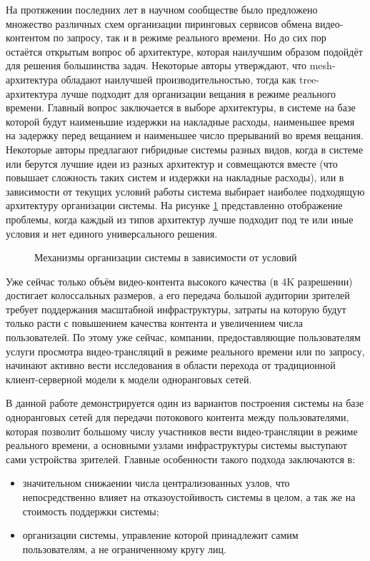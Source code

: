 	На протяжении последних лет в научном сообществе было предложено множество различных схем организации пиринговых
	сервисов обмена видео-контентом по запросу, так и в режиме реального времени. Но до сих пор остаётся открытым вопрос
	об архитектуре, которая наилучшим образом подойдёт для решения большинства задач. Некоторые авторы утверждают, что
	mesh-архитектура обладают наилучшей производительностью, тогда как tree-архитектура лучше подходит для организации
	вещания в режиме реального времени. Главный вопрос заключается в выборе архитектуры, в системе на базе которой будут
	наименьшие издержки на накладные расходы, наименьшее время на задержку перед вещанием и наименьшее число прерываний
	во время вещания. Некоторые авторы предлагают гибридные системы разных видов, когда в системе или берутся лучшие
	идеи из разных архитектур и совмещаются вместе (что повышает сложность таких систем и издержки на накладные расходы),
	или в зависимости от текущих условий работы система выбирает наиболее подходящую архитектуру организации системы.
	На рисунке \ref{img:p2p-mechanisms} представленно отображение проблемы, когда каждый из типов архитектур лучше
	подходит под те или иные условия и нет единого универсального решения.

	\begin{figure}[h]
		\caption{Механизмы организации системы в зависимости от условий}
		\label{img:p2p-mechanisms}
	\end{figure}

	Уже сейчас только объём видео-контента высокого качества (в 4K разрешении) достигает колоссальных размеров, а его
	передача большой аудитории зрителей требует поддержания масштабной инфраструктуры, затраты на которую будут только
	расти с повышением качества контента и увеличением числа пользователей. По этому уже сейчас, компании,
	предоставляющие пользователям услуги просмотра видео-трансляций в режиме реального времени или по запросу, начинают
	активно вести исследования в области перехода от традиционной клиент-серверной модели к модели одноранговых сетей.

	В данной работе демонстрируется один из вариантов построения системы на базе одноранговых сетей для передачи
	потокового контента между пользователями, которая позволит большому числу участников вести видео-трансляции в режиме
	реального времени, а основными узлами инфраструктуры системы выступают сами устройства зрителей. Главные особенности
	такого подхода заключаются в:
	\begin{itemize}
		\item значительном снижаении числа централизованных узлов, что непосредственно влияет на отказоустойивость
		системы в целом, а так же на стоимость поддержки системы;
		\item организации системы, управление которой принадлежит самим пользователям, а не ограниченному кругу лиц.
	\end{itemize}

